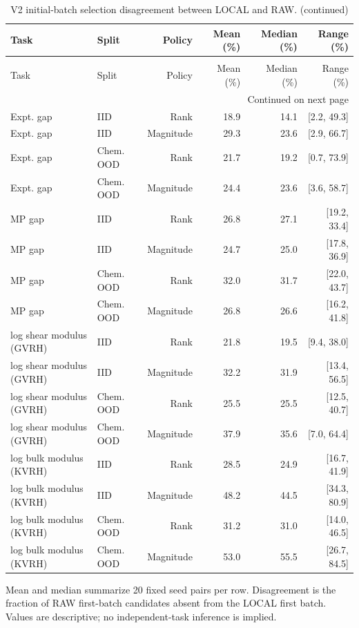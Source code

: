 \setlength{\tabcolsep}{4pt}
\footnotesize
\begin{longtable}{@{}llrrrr@{}}
\caption{V2 initial-batch selection disagreement between LOCAL and RAW.}\label{tab:v2_disagreement}\\
\toprule
Task & Split & Policy & Mean (\%) & Median (\%) & Range (\%) \\
\midrule
\endfirsthead
\caption[]{V2 initial-batch selection disagreement between LOCAL and RAW. (continued)}\\
\toprule
Task & Split & Policy & Mean (\%) & Median (\%) & Range (\%) \\
\midrule
\endhead
\midrule\multicolumn{6}{r}{Continued on next page}\\
\endfoot
\bottomrule
\endlastfoot
Expt. gap & IID & Rank & 18.9 & 14.1 & [2.2, 49.3] \\
Expt. gap & IID & Magnitude & 29.3 & 23.6 & [2.9, 66.7] \\
Expt. gap & Chem. OOD & Rank & 21.7 & 19.2 & [0.7, 73.9] \\
Expt. gap & Chem. OOD & Magnitude & 24.4 & 23.6 & [3.6, 58.7] \\
MP gap & IID & Rank & 26.8 & 27.1 & [19.2, 33.4] \\
MP gap & IID & Magnitude & 24.7 & 25.0 & [17.8, 36.9] \\
MP gap & Chem. OOD & Rank & 32.0 & 31.7 & [22.0, 43.7] \\
MP gap & Chem. OOD & Magnitude & 26.8 & 26.6 & [16.2, 41.8] \\
log shear modulus (GVRH) & IID & Rank & 21.8 & 19.5 & [9.4, 38.0] \\
log shear modulus (GVRH) & IID & Magnitude & 32.2 & 31.9 & [13.4, 56.5] \\
log shear modulus (GVRH) & Chem. OOD & Rank & 25.5 & 25.5 & [12.5, 40.7] \\
log shear modulus (GVRH) & Chem. OOD & Magnitude & 37.9 & 35.6 & [7.0, 64.4] \\
log bulk modulus (KVRH) & IID & Rank & 28.5 & 24.9 & [16.7, 41.9] \\
log bulk modulus (KVRH) & IID & Magnitude & 48.2 & 44.5 & [34.3, 80.9] \\
log bulk modulus (KVRH) & Chem. OOD & Rank & 31.2 & 31.0 & [14.0, 46.5] \\
log bulk modulus (KVRH) & Chem. OOD & Magnitude & 53.0 & 55.5 & [26.7, 84.5] \\
\end{longtable}
\noindent\footnotesize Mean and median summarize 20 fixed seed pairs per row. Disagreement is the fraction of RAW first-batch candidates absent from the LOCAL first batch. Values are descriptive; no independent-task inference is implied.
